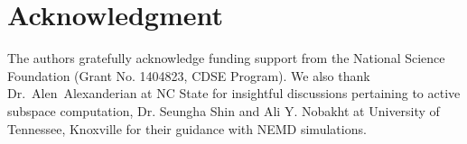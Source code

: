 \section*{Acknowledgment}

The authors gratefully acknowledge funding support from the
National Science Foundation (Grant No. 1404823, CDSE Program).
We also thank Dr.~Alen~Alexanderian at NC State for
insightful discussions pertaining to active subspace computation,
Dr. Seungha Shin and Ali Y. Nobakht at University of
Tennessee, Knoxville for their guidance with NEMD simulations.
